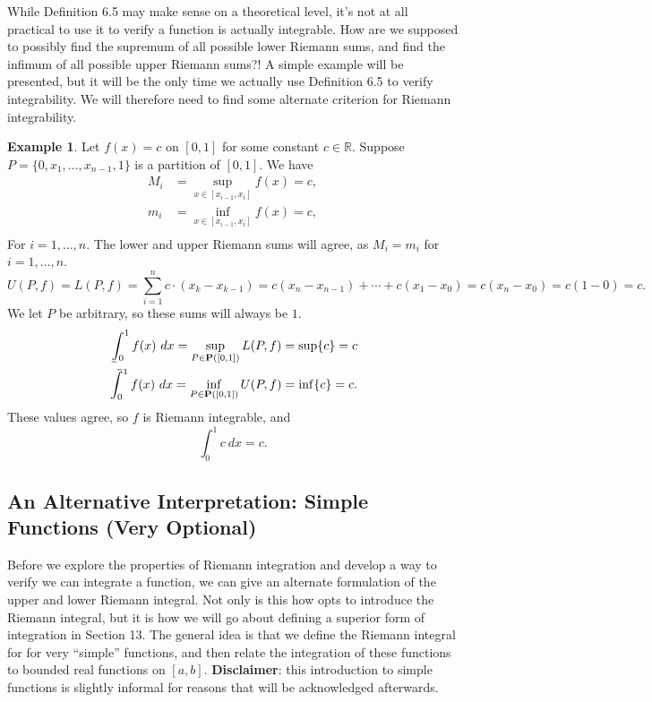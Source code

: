 \documentclass{article}
\def\upint{\mathchoice%
	{\mkern13mu\overline{\vphantom{\intop}\mkern7mu}\mkern-20mu}%
	{\mkern7mu\overline{\vphantom{\intop}\mkern7mu}\mkern-14mu}%
	{\mkern7mu\overline{\vphantom{\intop}\mkern7mu}\mkern-14mu}%
	{\mkern7mu\overline{\vphantom{\intop}\mkern7mu}\mkern-14mu}%
	\int}
\def\lowint{\mkern3mu\underline{\vphantom{\intop}\mkern7mu}\mkern-10mu\int}
\newcommand{\R}{\mathbb{R}}
\theoremstyle{definition}
\newtheorem{example}{Example}[section]
\begin{document}
	While Definition 6.5 may make sense on a theoretical level, it's not at all practical to use it to verify a function is actually integrable. How are we supposed to possibly find the supremum of all possible lower Riemann sums, and find the infimum of all possible upper Riemann sums?! A simple example will be presented, but it will be the only time we actually use Definition 6.5 to verify integrability. We will therefore need to find some alternate criterion for Riemann integrability.    
	\begin{example}
		Let $ f(x)=c $ on $ [0,1] $ for some constant $ c\in\R  $. Suppose $ P=\{0,x_1,\ldots,x_{n-1},1\} $ is a partition of $ [0,1] $. We have  \begin{align*}
			M_i&=\sup_{x\in[x_{i-1},x_i]} f(x)=c,\\
			m_i&=\inf_{x\in[x_{i-1},x_i]} f(x)=c,\\
		\end{align*} 
		For $ i=1,\ldots, n $. The lower and upper Riemann sums will agree, as $ M_i=m_i $ for $ i=1,\ldots, n $. $$ U(P,f)=L(P, f)=\sum_{i=1}^{n}c\cdot(x_k-x_{k-1})=c(x_n-x_{n-1})+\cdots +c(x_1-x_0)=c(x_n-x_0)=c(1-0)= c.$$ We let $ P $ be arbitrary, so these sums will always be $ 1 $.
		\begin{align*}
			\lowint_0^1 f(x)\ dx=\sup\limits_{P\in\textbf{P}([0,1])} L(P,f)=\sup\{c\}=c\\ \upint_0^1 f(x)\ dx =\inf\limits_{P\in\textbf{P}([0,1])} U(P,f)=\inf\{c\}=c.
		\end{align*}  
		These values agree, so $ f $ is Riemann integrable, and $$\int_{0}^{1} c\ dx=c .$$
	\end{example}
	\subsection{An Alternative Interpretation: Simple Functions (Very Optional)}
	Before we explore the properties of Riemann integration and develop a way to verify we can integrate a function, we can give an alternate formulation of the upper and lower Riemann integral. Not only is this  how \cite{tao2006analysis} opts to introduce the Riemann integral, but it is how we will go about defining a superior form of integration in Section 13. The general idea is that we define the Riemann integral for for very ``simple'' functions, and then relate the integration of these functions to bounded real functions on $ [a,b] $. \textbf{Disclaimer}: this introduction to simple functions is slightly informal for reasons that will be acknowledged afterwards. 
	
\end{document}
